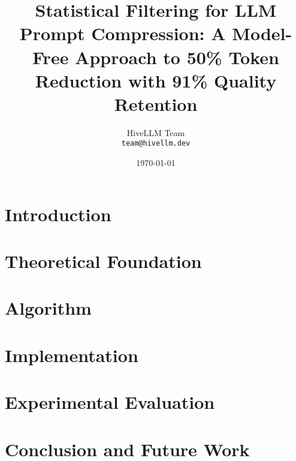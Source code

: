 \documentclass{article}
\title{Statistical Filtering for LLM Prompt Compression: A Model-Free Approach to 50\% Token Reduction with 91\% Quality Retention}
\author{
  HiveLLM Team \\
  \texttt{team@hivellm.dev}
}
\date{\today}
\begin{document}
\maketitle

\begin{abstract}

\end{abstract}

\section{Introduction}


\section{Theoretical Foundation}


\section{Algorithm}


\section{Implementation}


\section{Experimental Evaluation}


\section{Conclusion and Future Work}




\end{document}
